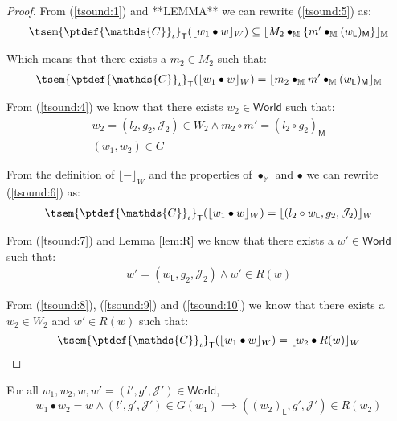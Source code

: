 {\begin{proof}
From (\ref{tsound:1}) and **LEMMA** we can rewrite (\ref{tsound:5}) as:
\[
	\tsem{\ptdef{\mathds{C}}_\iota}_\mathsf{T}(\lfloor w_1 \bullet w \rfloor_W)
	\subseteq
	\lfloor M_2 \bullet_\mathbb{M} \{m' \bullet_\mathbb{M} (w_\mathsf{L})_\mathsf{M}\} \rfloor_\mathbb{M}
\]

Which means that there exists a $m_2 \in M_2$ such that:
\begin{gather}\label{tsound:6}
	\tsem{\ptdef{\mathds{C}}_\iota}_\mathsf{T}(\lfloor w_1 \bullet w \rfloor_W)
	=
	\lfloor m_2 \bullet_\mathbb{M} m' \bullet_\mathbb{M} (w_\mathsf{L})_\mathsf{M} \rfloor_\mathbb{M}
\end{gather}

From (\ref{tsound:4}) we know that there exists $w_2 \in \mathsf{World}$ such that:
\begin{gather}
\label{tsound:8} w_2 = (l_2, g_2, \mathcal{J}_2) \in W_2 \land m_2 \circ m' = (l_2 \circ g_2)_\mathsf{M} \\
\label{tsound:7} (w_1, w_2) \in G
\end{gather}

From the definition of $\lfloor - \rfloor_W$ and the properties of $\bullet_\mathbb{M}$ and $\bullet$ we can rewrite (\ref{tsound:6}) as:
\begin{gather}\label{tsound:9}
	\tsem{\ptdef{\mathds{C}}_\iota}_\mathsf{T}(\lfloor w_1 \bullet w \rfloor_W)
	=
	\lfloor (l_2 \circ w_\mathsf{L}, g_2, \mathcal{J}_2) \rfloor_W
\end{gather}

From (\ref{tsound:7}) and Lemma \ref{lem:R} we know that there exists a $w' \in \mathsf{World}$ such that:
\begin{gather}\label{tsound:10}
	w' = (w_\mathsf{L}, g_2, \mathcal{J}_2) \land w' \in R(w)
\end{gather}

From (\ref{tsound:8}), (\ref{tsound:9}) and (\ref{tsound:10}) we know that there exists a $w_2 \in W_2$ and $w' \in R(w)$ such that:
\[
	\tsem{\ptdef{\mathds{C}}_\iota}_\mathsf{T}(\lfloor w_1 \bullet w \rfloor_W) = \lfloor w_2 \bullet R(w) \rfloor_W
\]
\end{proof}
}

\lem \label{lem:R} For all $w_1, w_2, w, w' = (l', g', \mathcal{J}') \in \mathsf{World}$,
\[
	w_1 \bullet w_2 = w \land (l', g', \mathcal{J}') \in G(w_1) \implies ((w_2)_\mathsf{L}, g', \mathcal{J}') \in R(w_2)
\]

